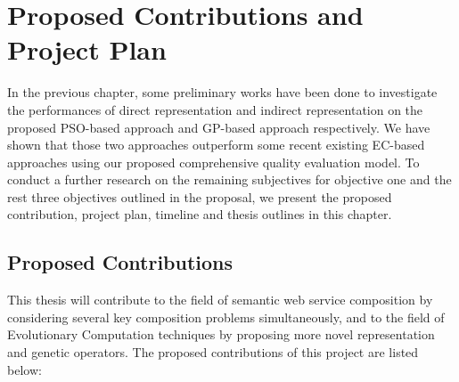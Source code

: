 \chapter{Proposed Contributions and Project Plan}\label{C:plan}
In the previous chapter, some preliminary works have been done to investigate the performances of direct representation and indirect representation on the proposed PSO-based approach and GP-based approach respectively. We have shown that those two approaches outperform some recent existing EC-based approaches using our proposed comprehensive quality evaluation model. To conduct a further research on the remaining subjectives for objective one and the rest three objectives outlined in the proposal, we present the proposed contribution, project plan, timeline and thesis outlines in this chapter.

\section{Proposed Contributions}
This thesis will contribute to the field of semantic web service composition by considering several key composition problems simultaneously, and to the field of Evolutionary Computation techniques by proposing more novel representation and genetic operators. The proposed contributions of this project are listed below:

